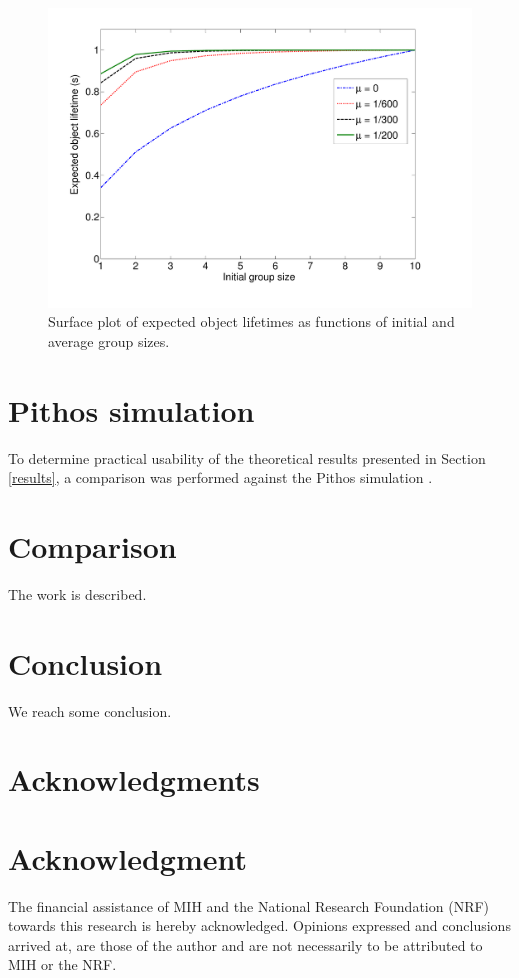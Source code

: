 \documentclass[10pt,a4paper,conference]{IEEEtran}
\begin{document}
\begin{figure}[htbp]
 \centering
 \includegraphics[clip=true, viewport=2.0cm 1.0cm 27.5cm 20cm, width=0.7\columnwidth]{lifetime_av_models_compare}
 \caption{Surface plot of expected object lifetimes as functions of initial and average group sizes.}
 \label{fig_markov_example}
\end{figure}

\section{Pithos simulation}
\label{simulation}

To determine practical usability of the theoretical results presented in Section \ref{results}, a comparison was performed against the Pithos simulation \cite{Pithos_mmve_2011}.


\section{Comparison}
\label{comparison}

The work is described.

\section{Conclusion}
\label{conclusion}

We reach some conclusion.

\ifCLASSOPTIONcompsoc
  \section*{Acknowledgments}
\else
  \section*{Acknowledgment}
\fi

The financial assistance of MIH and the National Research Foundation (NRF) towards this research is hereby acknowledged. Opinions expressed and
conclusions arrived at, are those of the author and are not necessarily to be attributed to MIH or the NRF.




\end{document}
